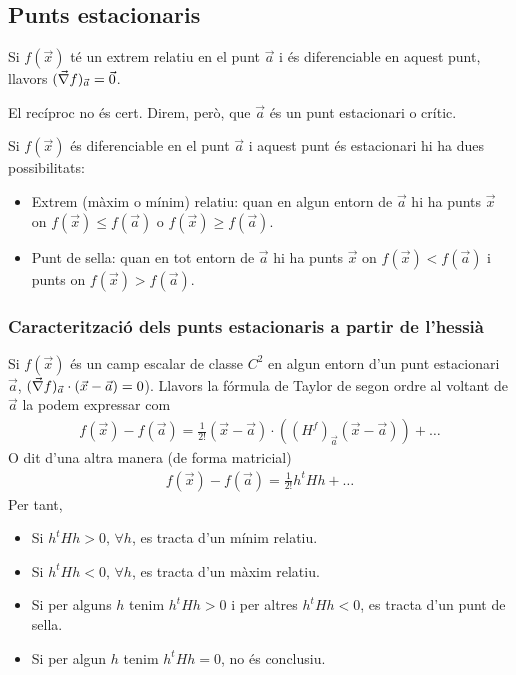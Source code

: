 \subsection{Punts estacionaris}
\begin{thm}
    Si $f(\vec{x})$ té un extrem relatiu en el punt $\vec{a}$ i és diferenciable en aquest punt, llavors $(\vec{\nabla} f)_{\vec{a}} = \vec{0}$.
\end{thm}
El recíproc no és cert. Direm, però, que $\vec{a}$ és un punt estacionari o crític.

Si $f(\vec{x})$ és diferenciable en el punt $\vec{a}$ i aquest punt és estacionari hi ha dues possibilitats:
\begin{itemize}
    \item Extrem (màxim o mínim) relatiu: quan en algun entorn de $\vec{a}$ hi ha punts $\vec{x}$ on $f(\vec{x}) \leq f(\vec{a})$ o $f(\vec{x}) \geq f(\vec{a})$.
    \item Punt de sella: quan en tot entorn de $\vec{a}$ hi ha punts $\vec{x}$ on $f(\vec{x}) < f(\vec{a})$ i punts on $f(\vec{x}) > f(\vec{a})$.
\end{itemize}

\subsubsection*{Caracterització dels punts estacionaris a partir de l'hessià}
Si $f(\vec{x})$ és un camp escalar de classe $C^{2}$ en algun entorn d'un punt estacionari $\vec{a}$, $(\vec{\nabla} f)_{\vec{a}} \cdot (\vec{x} - \vec{a}) = 0$). Llavors la fórmula de Taylor de segon ordre al voltant de $\vec{a}$ la podem expressar com
\begin{align}
    f(\vec{x}) - f(\vec{a}) = \frac{1}{2!} (\vec{x} - \vec{a}) \cdot ((H^{f})_{\vec{a}}(\vec{x} - \vec{a})) + \dots
\end{align}
O dit d'una altra manera (de forma matricial)
\begin{align}
    f(\vec{x}) - f(\vec{a}) = \frac{1}{2!} h^{t} H h + \dots
\end{align}
Per tant,
\begin{itemize}
    \item Si $h^{t} H h > 0, \, \forall h$, es tracta d'un mínim relatiu.
    \item Si $h^{t} H h < 0, \, \forall h$, es tracta d'un màxim relatiu.
    \item Si per alguns $h$ tenim $h^{t} H h > 0$ i per altres $h^{t} H h < 0$, es tracta d'un punt de sella.
    \item Si per algun $h$ tenim $h^{t} H h = 0$, no és conclusiu.
\end{itemize}

